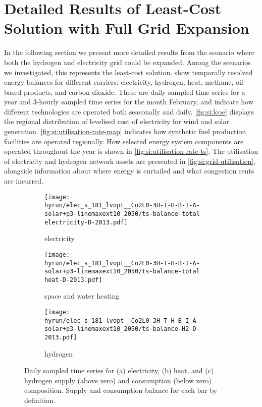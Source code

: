 

\section{Detailed Results of Least-Cost Solution with Full Grid Expansion}
\label{sec:si:detailed}

In the following section we present more detailed results from the scenario
where both the hydrogen and electricity grid could be expanded. Among the
scenarios we investigated, this represents the least-cost solution.
 show temporally resolved energy
balances for different carriers: electricity, hydrogen, heat, methane, oil-based
products, and carbon dioxide. These are daily sampled time series for a year and
3-hourly sampled time series for the month February, and indicate how different
technologies are operated both seasonally and daily. \cref{fig:si:lcoe} displays
the regional distribution of levelised cost of electricity for wind and solar
generation. \cref{fig:si:utilisation-rate-map} indicates how synthetic fuel
production facilities are operated regionally. How selected energy system
components are operated throughout the year is shown in
\cref{fig:si:utilisation-rate-ts}. The utilisation of electricity and hydrogen
network assets are presented in \cref{fig:si:grid-utilisation}, alongside
information about where energy is curtailed and what congestion rents are
incurred.

\begin{figure}
    \centering

    \begin{subfigure}[t]{\textwidth}
        \centering
        \caption{electricity}
        \texttt{[image: \\hyrun/elec\_s\_181\_lvopt\_\_Co2L0-3H-T-H-B-I-A-solar+p3-linemaxext10\_2050/ts-balance-total electricity-D-2013.pdf]}
    \end{subfigure}
    \begin{subfigure}[t]{\textwidth}
        \centering
        \caption{space and water heating}
        \texttt{[image: \\hyrun/elec\_s\_181\_lvopt\_\_Co2L0-3H-T-H-B-I-A-solar+p3-linemaxext10\_2050/ts-balance-total heat-D-2013.pdf]}
    \end{subfigure}
    \begin{subfigure}[t]{\textwidth}
        \centering
        \caption{hydrogen}
        \texttt{[image: \\hyrun/elec\_s\_181\_lvopt\_\_Co2L0-3H-T-H-B-I-A-solar+p3-linemaxext10\_2050/ts-balance-H2-D-2013.pdf]}
    \end{subfigure}

    \caption{Daily sampled time series for (a) electricity, (b) heat, and (c) hydrogen supply (above zero) and consumption (below zero) composition. Supply and consumption balance for each bar by definition.}
    \label{fig:output-ts-1}
\end{figure}

